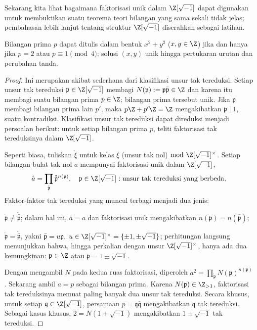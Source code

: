Sekarang kita lihat bagaimana faktorisasi unik dalam $\Z[\sqrt{-1}]$ dapat digunakan untuk membuktikan suatu teorema teori bilangan yang sama sekali tidak jelas; pembahasan lebih lanjut tentang struktur $\Z[\sqrt{-1}]$ diserahkan sebagai latihan.
\begin{theorem}[Fermat]\label{prop:sum-squares}
	Bilangan prima $p$ dapat ditulis dalam bentuk $x^2 + y^2$ ($x,y \in \Z$) jika dan hanya jika $p=2$ atau $p \equiv 1 \pmod 4$; solusi $(x,y)$ unik hingga pertukaran urutan dan perubahan tanda.
\end{theorem}
\begin{proof}
	Ini merupakan akibat sederhana dari klasifikasi unsur tak tereduksi. Setiap unsur tak tereduksi $\mathfrak{p} \in \Z[\sqrt{-1}]$ membagi $N(\mathfrak{p}) := \mathfrak{p}\bar{\mathfrak{p}} \in \Z$ dan karena itu membagi suatu bilangan prima $p \in \Z$; bilangan prima tersebut unik. Jika $\mathfrak{p}$ membagi bilangan prima lain $p'$, maka $p\Z + p'\Z = \Z$ mengakibatkan $\mathfrak{p} \mid 1$, suatu kontradiksi. Klasifikasi unsur tak tereduksi dapat direduksi menjadi persoalan berikut: untuk setiap bilangan prima $p$, teliti faktorisasi tak tereduksinya dalam $\Z[\sqrt{-1}]$.
	
	Seperti biasa, tuliskan $\mathring{\xi}$ untuk kelas $\xi$ (unsur tak nol) $\bmod\; \Z[\sqrt{-1}]^\times$. Setiap bilangan bulat tak nol $a$ mempunyai faktorisasi unik dalam $\Z[\sqrt{-1}]$,
	\[ \mathring{a} = \prod_{\mathring{\mathfrak{p}}} \mathring{\mathfrak{p}}^{n(\mathfrak{p})}, \quad \mathfrak{p} \in \Z[\sqrt{-1}]: \text{unsur tak tereduksi yang berbeda}, \]
	Faktor-faktor tak tereduksi yang muncul terbagi menjadi dua jenis:
	\begin{compactitem}
		\item $\mathring{\mathfrak{p}} \neq \mathring{\bar{\mathfrak{p}}}$; dalam hal ini, $\bar{a}=a$ dan faktorisasi unik mengakibatkan $n(\mathfrak{p}) = n(\bar{\mathfrak{p}})$;
		\item $\mathring{\mathfrak{p}} = \mathring{\bar{\mathfrak{p}}}$, yakni $\bar{\mathfrak{p}}=u\mathfrak{p}, \; u \in \Z[\sqrt{-1}]^\times = \{\pm 1, \pm\sqrt{-1}\}$; perhitungan langsung menunjukkan bahwa, hingga perkalian dengan unsur $\Z[\sqrt{-1}]^\times$, hanya ada dua kemungkinan: $\mathfrak{p} \in \Z$ atau $\mathfrak{p} = 1 \pm \sqrt{-1}$.
	\end{compactitem}
	Dengan mengambil $N$ pada kedua ruas faktorisasi, diperoleh $a^2 = \prod_{\mathring{\mathfrak{p}}} N(\mathfrak{p})^{n(\mathfrak{p})}$. Sekarang ambil $a=p$ sebagai bilangan prima. Karena $N(\mathfrak{p}) \in \Z_{> 1}$, faktorisasi tak tereduksinya memuat paling banyak dua unsur tak tereduksi. Secara khusus, untuk setiap $\mathfrak{q} \in \Z[\sqrt{-1}]$, persamaan $p = \mathfrak{q}\bar{\mathfrak{q}}$ mengakibatkan $\mathfrak{q}$ tak tereduksi. Sebagai kasus khusus, $2 = N(1 + \sqrt{-1})$ mengakibatkan $1 \pm \sqrt{-1}$ tak tereduksi.


\end{proof}
